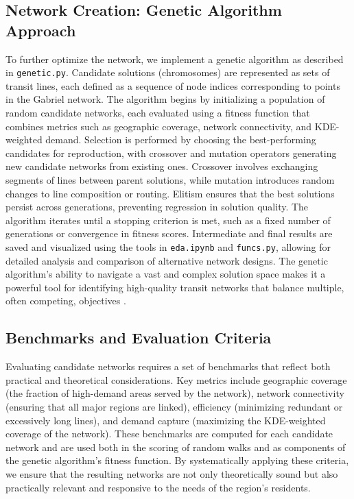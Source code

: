 \documentclass[manuscript,screen,review]{acmart}
\begin{document}
\subsection{Network Creation: Genetic Algorithm Approach}
To further optimize the network, we implement a genetic algorithm as described in \texttt{genetic.py}. Candidate solutions (chromosomes) are represented as sets of transit lines, each defined as a sequence of node indices corresponding to points in the Gabriel network. The algorithm begins by initializing a population of random candidate networks, each evaluated using a fitness function that combines metrics such as geographic coverage, network connectivity, and KDE-weighted demand. Selection is performed by choosing the best-performing candidates for reproduction, with crossover and mutation operators generating new candidate networks from existing ones. Crossover involves exchanging segments of lines between parent solutions, while mutation introduces random changes to line composition or routing. Elitism ensures that the best solutions persist across generations, preventing regression in solution quality. The algorithm iterates until a stopping criterion is met, such as a fixed number of generations or convergence in fitness scores. Intermediate and final results are saved and visualized using the tools in \texttt{eda.ipynb} and \texttt{funcs.py}, allowing for detailed analysis and comparison of alternative network designs. The genetic algorithm's ability to navigate a vast and complex solution space makes it a powerful tool for identifying high-quality transit networks that balance multiple, often competing, objectives \cite{bib:chien2001genetic, bib:dib2017ga}.

\subsection{Benchmarks and Evaluation Criteria}
Evaluating candidate networks requires a set of benchmarks that reflect both practical and theoretical considerations. Key metrics include geographic coverage (the fraction of high-demand areas served by the network), network connectivity (ensuring that all major regions are linked), efficiency (minimizing redundant or excessively long lines), and demand capture (maximizing the KDE-weighted coverage of the network). These benchmarks are computed for each candidate network and are used both in the scoring of random walks and as components of the genetic algorithm's fitness function. By systematically applying these criteria, we ensure that the resulting networks are not only theoretically sound but also practically relevant and responsive to the needs of the region's residents.
\end{document}
